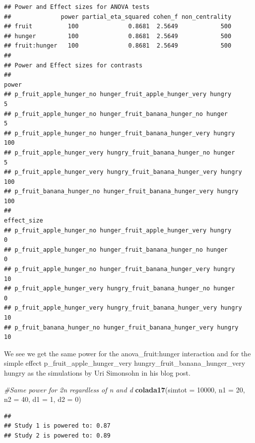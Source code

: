 \documentclass[]{book}
\newenvironment{Shaded}{\begin{snugshade}}{\end{snugshade}}
\newcommand{\CommentTok}[1]{\textcolor[rgb]{0.56,0.35,0.01}{\textit{#1}}}
\newcommand{\DataTypeTok}[1]{\textcolor[rgb]{0.13,0.29,0.53}{#1}}
\newcommand{\DecValTok}[1]{\textcolor[rgb]{0.00,0.00,0.81}{#1}}
\newcommand{\KeywordTok}[1]{\textcolor[rgb]{0.13,0.29,0.53}{\textbf{#1}}}
\newcommand{\NormalTok}[1]{#1}
\begin{document}
\begin{verbatim}
## Power and Effect sizes for ANOVA tests
##              power partial_eta_squared cohen_f non_centrality
## fruit          100              0.8681  2.5649            500
## hunger         100              0.8681  2.5649            500
## fruit:hunger   100              0.8681  2.5649            500
## 
## Power and Effect sizes for contrasts
##                                                                  power
## p_fruit_apple_hunger_no hunger_fruit_apple_hunger_very hungry        5
## p_fruit_apple_hunger_no hunger_fruit_banana_hunger_no hunger         5
## p_fruit_apple_hunger_no hunger_fruit_banana_hunger_very hungry     100
## p_fruit_apple_hunger_very hungry_fruit_banana_hunger_no hunger       5
## p_fruit_apple_hunger_very hungry_fruit_banana_hunger_very hungry   100
## p_fruit_banana_hunger_no hunger_fruit_banana_hunger_very hungry    100
##                                                                  effect_size
## p_fruit_apple_hunger_no hunger_fruit_apple_hunger_very hungry              0
## p_fruit_apple_hunger_no hunger_fruit_banana_hunger_no hunger               0
## p_fruit_apple_hunger_no hunger_fruit_banana_hunger_very hungry            10
## p_fruit_apple_hunger_very hungry_fruit_banana_hunger_no hunger             0
## p_fruit_apple_hunger_very hungry_fruit_banana_hunger_very hungry          10
## p_fruit_banana_hunger_no hunger_fruit_banana_hunger_very hungry           10
\end{verbatim}

We see we get the same power for the anova\_fruit:hunger interaction and for the simple effect p\_fruit\_apple\_hunger\_very hungry\_fruit\_banana\_hunger\_very hungry as the simulations by Uri Simonsohn in his blog post.

\begin{Shaded}
\begin{Highlighting}[]
\CommentTok{#Same power for 2n regardless of n and d}
\KeywordTok{colada17}\NormalTok{(}\DataTypeTok{simtot =} \DecValTok{10000}\NormalTok{, }\DataTypeTok{n1 =} \DecValTok{20}\NormalTok{, }\DataTypeTok{n2 =} \DecValTok{40}\NormalTok{, }\DataTypeTok{d1 =} \DecValTok{1}\NormalTok{, }\DataTypeTok{d2 =} \DecValTok{0}\NormalTok{)  }
\end{Highlighting}
\end{Shaded}

\begin{verbatim}
## 
## Study 1 is powered to: 0.87
## Study 2 is powered to: 0.89
\end{verbatim}
\end{document}
